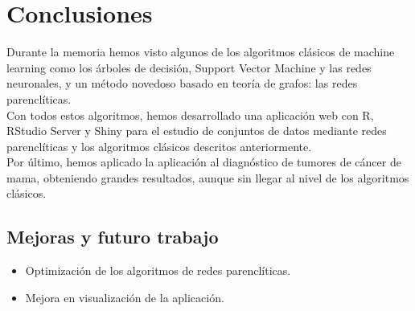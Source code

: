 \chapter{Conclusiones}
Durante la memoria hemos visto algunos de los algoritmos clásicos de machine learning como los árboles de decisión, Support  Vector Machine y las redes neuronales, y un método novedoso basado en teoría de grafos: las redes parenclíticas.\\

Con todos estos algoritmos, hemos desarrollado una aplicación web con R, RStudio Server y Shiny para el estudio de conjuntos de datos mediante redes parenclíticas y los algoritmos clásicos descritos anteriormente.\\

Por último, hemos aplicado la aplicación al diagnóstico de tumores de cáncer de mama, obteniendo grandes resultados, aunque sin llegar al nivel de los algoritmos clásicos.
   
\section{Mejoras y futuro trabajo}

\begin{itemize}
	\item Optimización de los algoritmos de redes parenclíticas.
	\item Mejora en visualización de la aplicación.
\end{itemize}